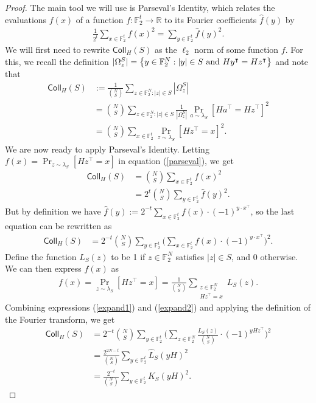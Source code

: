 \documentclass[12pt]{article}
\newcommand{\R}{\mathbb{R}}
\newcommand{\F}{\mathbb{F}}
\begin{document}
\begin{proof}
The main tool we will use is Parseval's Identity, which relates the evaluations $f(x)$ of a function $f:\mathbb{F}_2^t\rightarrow \R$ to its Fourier coefficients $\hat{f}(y)$ by
\begin{align}\label{parseval}
    \frac{1}{2^t}\sum_{x\in\mathbb{F}_2^t} f(x)^2=\sum_{y\in\mathbb{F}_2^t}\hat{f}(y)^2.
\end{align}
We will first need to rewrite $\mathsf{Coll}_H(S)$ as the $\ell_2$ norm of some function $f$. For this, we recall the definition $|\Omega_z^S|=\left\{y\in \mathbb{F}_2^N :|y|\in S\textnormal{ and } Hy^{\intercal}=Hz^\intercal   \right\}$ and note that
\begin{align*}
\mathsf{Coll}_H(S)&:=\frac{1}{\binom{N}{S}}\sum_{z\in\F_2^N:|z|\in S}|\Omega_z^S|\\
&= \binom{N}{S}\sum_{z\in\F_2^N:|z|\in S}\frac{1}{|\Omega_z^S|}\Pr_{a\sim\lambda_S}[Ha^\intercal=Hz^\intercal]^2\\
&=\binom{N}{S}\sum_{x \in \F_2^{t}} \Pr_{z\sim\lambda_S}[Hz^\intercal=x]^2.
\end{align*}
We are now ready to apply Parseval's Identity. Letting $f(x) =  \Pr_{z\sim \lambda_S}[Hz^\intercal = x]$ in equation (\ref{parseval}), we get
\begin{align*}
\mathsf{Coll}_H(S)& = \binom{N}{S}\sum_{x \in \F_2^{t}} f(x)^2 \\
& = 2^t\binom{N}{S}\sum_{y \in \F_2^{t}} \hat{f}(y)^2.
\end{align*}
But by definition we have $\hat{f}(y):=2^{-t}\sum_{x \in \F_2^{t}} f(x) \cdot  (-1)^{y\cdot x^\intercal}$, so the last equation can be rewritten as
\begin{align}\label{expand1}
\mathsf{Coll}_H(S) &= 2^{-t}\binom{N}{S} \sum_{y \in \F_2^{t}} \Big ( \sum_{x \in \F_2^{t}} f(x) \cdot  (-1)^{y\cdot x^\intercal } \Big)^2.
\end{align}
Define the function $L_S(z)$ to be 1 if $z\in\mathbb{F}_2^N$ satisfies $|z|\in S$, and 0 otherwise. We can then express $f(x)$ as
\begin{align}\label{expand2}
f(x) =  \Pr_{z\sim \lambda_S}[Hz^\intercal = x]=\frac{1}{\binom{N}{S}}\sum_{\substack{z\in\mathbb{F}_2^N \\ Hz^\intercal=x}}L_S(z).
\end{align}
Combining expressions (\ref{expand1}) and (\ref{expand2}) and applying the definition of the Fourier transform, we get
\begin{align*}
\mathsf{Coll}_H(S)& = 2^{-t} \binom{N}{S}  \sum_{y \in \F_2^{t}} \Big ( \sum_{z \in \F_2^N} \frac{L_{S}(z)}{\binom{N}{S}}\cdot (-1)^{yHz^\intercal} \Big )^2\\
& = \frac{2^{2N-t}}{\binom{N}{S}} \sum_{y \in \F_2^{t}} \hat{L}_S(yH)^2\\
&=\frac{2^{-t}}{\binom{N}{S}} \sum_{y \in \F_2^{t}} K_S(yH)^2.
\end{align*}
\end{proof}
\end{document}
